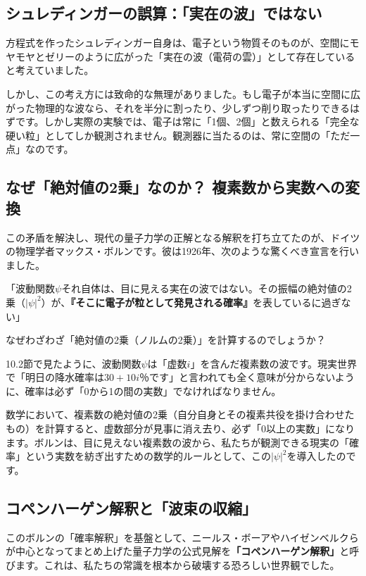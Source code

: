 \subsection{シュレディンガーの誤算：「実在の波」ではない}

方程式を作ったシュレディンガー自身は、電子という物質そのものが、空間にモヤモヤとゼリーのように広がった「実在の波（電荷の雲）」として存在していると考えていました。

しかし、この考え方には致命的な無理がありました。もし電子が本当に空間に広がった物理的な波なら、それを半分に割ったり、少しずつ削り取ったりできるはずです。しかし実際の実験では、電子は常に「1個、2個」と数えられる「完全な硬い粒」としてしか観測されません。観測器に当たるのは、常に空間の「ただ一点」なのです。

\subsection{なぜ「絶対値の2乗」なのか？ 複素数から実数への変換}

この矛盾を解決し、現代の量子力学の正解となる解釈を打ち立てたのが、ドイツの物理学者マックス・ボルンです。彼は1926年、次のような驚くべき宣言を行いました。

「波動関数\(\psi\)それ自体は、目に見える実在の波ではない。その振幅の絶対値の2乗（\(|\psi|^2\)）が、\textbf{『そこに電子が粒として発見される確率』}を表しているに過ぎない」

なぜわざわざ「絶対値の2乗（ノルムの2乗）」を計算するのでしょうか？

10.2節で見たように、波動関数\(\psi\)は「虚数\(i\)」を含んだ複素数の波です。現実世界で「明日の降水確率は\(30 + 10i\)％です」と言われても全く意味が分からないように、確率は必ず「0から1の間の実数」でなければなりません。

数学において、複素数の絶対値の2乗（自分自身とその複素共役を掛け合わせたもの）を計算すると、虚数部分が見事に消え去り、必ず「0以上の実数」になります。ボルンは、目に見えない複素数の波から、私たちが観測できる現実の「確率」という実数を紡ぎ出すための数学的ルールとして、この\(|\psi|^2\)を導入したのです。

\subsection{コペンハーゲン解釈と「波束の収縮」}

このボルンの「確率解釈」を基盤として、ニールス・ボーアやハイゼンベルクらが中心となってまとめ上げた量子力学の公式見解を\textbf{「コペンハーゲン解釈」}と呼びます。これは、私たちの常識を根本から破壊する恐ろしい世界観でした。


